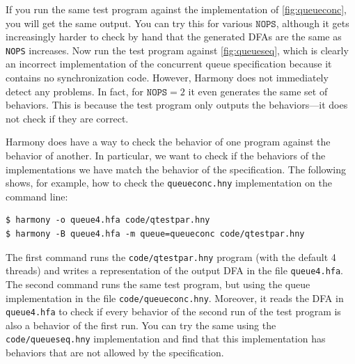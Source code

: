 \documentclass{report}
\newenvironment{code}{
\tcolorbox
}{
\endtcolorbox
}
\begin{document}
If you run the same test program against the implementation
of \autoref{fig:queueconc}, you will get the same output.  You can
try this for various $\texttt{NOPS}$, although it gets increasingly
harder to check by hand that the generated DFAs are the same as
\texttt{NOPS} increases.
Now run the test program against \autoref{fig:queueseq}, which is
clearly an incorrect implementation of the concurrent queue specification
because it contains no synchronization code.
However, Harmony does not immediately detect
any problems.  In fact, for $\mathtt{NOPS} = 2$ it even generates
the same set of behaviors.
This is because the test program only outputs the behaviors---it does
not check if they are correct.

Harmony does have a way to check the behavior of one program against
the behavior of another.  In particular, we want to check if the
behaviors of the implementations we have match the behavior of the
specification.  The following shows, for example, how to check the
\texttt{queueconc.hny} implementation on the command line:

\begin{code}
\begin{verbatim}
$ harmony -o queue4.hfa code/qtestpar.hny
$ harmony -B queue4.hfa -m queue=queueconc code/qtestpar.hny
\end{verbatim}
\end{code}

The first command runs the \texttt{code/qtestpar.hny} program (with the
default 4 threads)
and writes a representation of the output DFA in the file \texttt{queue4.hfa}.
The second command runs the same test program, but using the queue
implementation in the file \texttt{code/queueconc.hny}.  Moreover, it reads
the DFA in \texttt{queue4.hfa} to check if every behavior of the second
run of the test program is also a behavior of the first run.
You can try the same using the \texttt{code/queueseq.hny} implementation
and find that this implementation has behaviors that are not allowed by
the specification.
\end{document}
